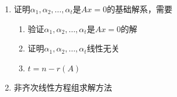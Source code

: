 \documentclass[a4paper,12pt]{article}
\begin{document}
\begin{enumerate}
\begin{enumerate}
\begin{enumerate}
\[\begin{tikzpicture}[baseline=(current bounding box.center)]
                        \draw[thick,black]
                        ([xshift=12pt,yshift=-12pt]mat.north west) --
                        ([xshift=-60pt,yshift=24pt]mat.south east);
                    \end{tikzpicture}
                \]
            \end{enumerate}
            \item Case:
            \[
                \left[
                    \begin{array}{ccc|c}
                        1 & -1              & a                & 2   \\
                        & \underline{a-1} & a+2              & -3  \\
                        &                 & \underline{2a+6} & a-9
                    \end{array}
                    \right]
            \]
            从下向上依次检查与$0$的关系
            \begin{enumerate}
                \item 先看$2a + 6 = 0$
                \item 再看$a - 1 = 0$
            \end{enumerate}
            \begin{align*}
                & \text{唯一解} && \Leftrightarrow r(A) = r(\bar{A}) = n && \Leftrightarrow a \neq 1 \text{ 且 } a \neq -3 \\
                & \text{无穷解} && \Leftrightarrow r(A) = r(\bar{A}) < n && \Leftrightarrow a = 1 \\
                & \text{无解}   && \Leftrightarrow r(A) + 1 = r(\bar{A}) && \Leftrightarrow a = -3
            \end{align*}
        \end{enumerate}
        \item 证明$\alpha_1,\alpha_2,\dots,\alpha_t$是$Ax = 0$的基础解系，需要
        \begin{enumerate}
            \item 验证$\alpha_1,\alpha_2,\dots,\alpha_t$是$Ax = 0$的解
            \item 证明$\alpha_1,\alpha_2,\dots,\alpha_t$线性无关
            \item $t = n - r(A)$
        \end{enumerate}
        \item 非齐次线性方程组求解方法
        \begin{enumerate}

\end{enumerate}
\end{enumerate}
\end{document}
